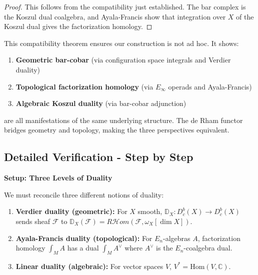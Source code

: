 \begin{proof}
This follows from the compatibility just established. The bar complex is the Koszul dual coalgebra, and Ayala-Francis show that integration over $X$ of the Koszul dual gives the factorization homology.
\end{proof}

\begin{remark}\label{rem:why-verdier-AF-matters}
This compatibility theorem ensures our construction is not ad hoc. It shows:

\begin{enumerate}
\item \textbf{Geometric bar-cobar} (via configuration space integrals and Verdier duality)
\item \textbf{Topological factorization homology} (via $E_\infty$ operads and Ayala-Francis)
\item \textbf{Algebraic Koszul duality} (via bar-cobar adjunction)
\end{enumerate}

are all manifestations of the same underlying structure. The de Rham functor bridges geometry and topology, making the three perspectives equivalent.
\end{remark}

\subsection{Detailed Verification - Step by Step}

\textbf{Setup: Three Levels of Duality}

We must reconcile three different notions of duality:

\begin{enumerate}
\item \textbf{Verdier duality (geometric):} For $X$ smooth, $\mathbb{D}_X: D^b_c(X) 
\to D^b_c(X)$ sends sheaf $\mathcal{F}$ to $\mathbb{D}_X(\mathcal{F}) = 
R\mathcal{H}om(\mathcal{F}, \omega_X[\dim X])$.

\item \textbf{Ayala-Francis duality (topological):} For $E_n$-algebras $A$, 
factorization homology $\int_M A$ has a dual $\int_M A^{\vee}$ where $A^{\vee}$ 
is the $E_n$-coalgebra dual.

\item \textbf{Linear duality (algebraic):} For vector spaces $V$, $V^* = 
\text{Hom}(V, \mathbb{C})$.
\end{enumerate}

